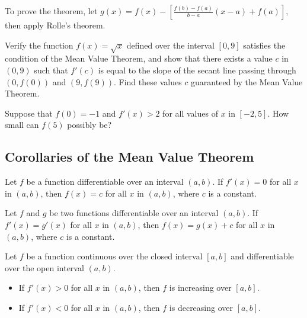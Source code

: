 To prove the theorem, let
\(g(x)=f(x) - [\frac{f(b) - f(a)}{b - a}(x - a)+f(a)]\), then apply Rolle's
theorem.

\begin{example}

Verify the function \(f(x)=\sqrt{x}\) defined over the interval
\([0,9]\) satisfies the condition of the Mean Value Theorem, and show
that there exists a value \(c\) in \((0,9)\) such that \(f'(c)\) is
equal to the slope of the secant line passing through \((0,f(0))\) and
\((9,f(9))\). Find these values \(c\) guaranteed by the Mean Value
Theorem.

\end{example}
\vspace*{6\baselineskip}

\begin{example}

Suppose that \(f(0)=-1\) and \(f'(x)>2\) for all values of \(x\) in
\([-2, 5]\). How small can \(f(5)\) possibly be?

\end{example}
\vspace*{6\baselineskip}

\hypertarget{corollaries-of-the-mean-value-theorem}{%
\subsection{Corollaries of the Mean Value
Theorem}\label{corollaries-of-the-mean-value-theorem}}

\begin{corollary}

Let \(f\) be a function differentiable over an interval \((a, b)\). If
\(f'(x)=0\) for all \(x\) in \((a, b)\), then \(f(x)=c\) for all \(x\)
in \((a, b)\), where \(c\) is a constant.

\end{corollary}

\begin{corollary}

Let \(f\) and \(g\) be two functions differentiable over an interval
\((a, b)\). If \(f'(x)=g'(x)\) for all \(x\) in \((a, b)\), then
\(f(x)=g(x)+c\) for all \(x\) in \((a, b)\), where \(c\) is a constant.

\end{corollary}

\begin{corollary}

Let \(f\) be a function continuous over the closed interval \([a,b]\)
and differentiable over the open interval \((a,b)\).

\begin{itemize}[sepno]
\item
  If \(f'(x)>0\) for all \(x\) in \((a, b)\), then \(f\) is increasing
  over \([a, b]\).
\item
  If \(f'(x)<0\) for all \(x\) in \((a, b)\), then \(f\) is decreasing
  over \([a, b]\).
\end{itemize}

\end{corollary}

